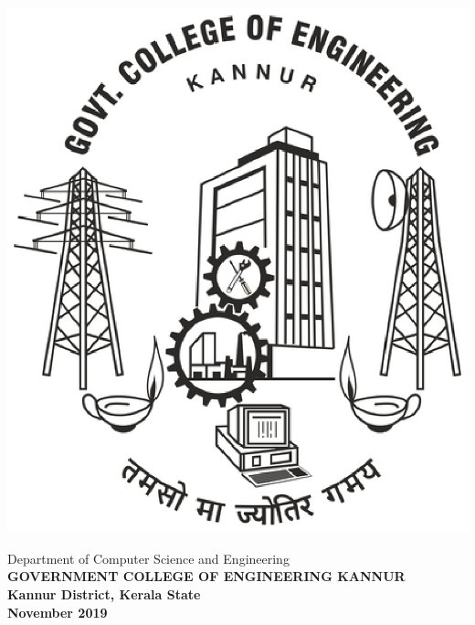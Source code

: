 \begin{titlepage}
\begin{center}
{  \vspace{.75cm}
        \vspace*{10pt}
          \centerline{\includegraphics [keepaspectratio=true, scale=.3]{gcek.eps}}
  
  
  \vspace{.75cm}
        {{\sc Department of Computer Science and Engineering}}\\
        {\bf \MakeUppercase{Government College  of Engineering Kannur}}\\ 
        {\bf Kannur District, Kerala State}\\
              {\bf November 2019}
  }
\end{center}
\end{titlepage}

\cleardoublepage


